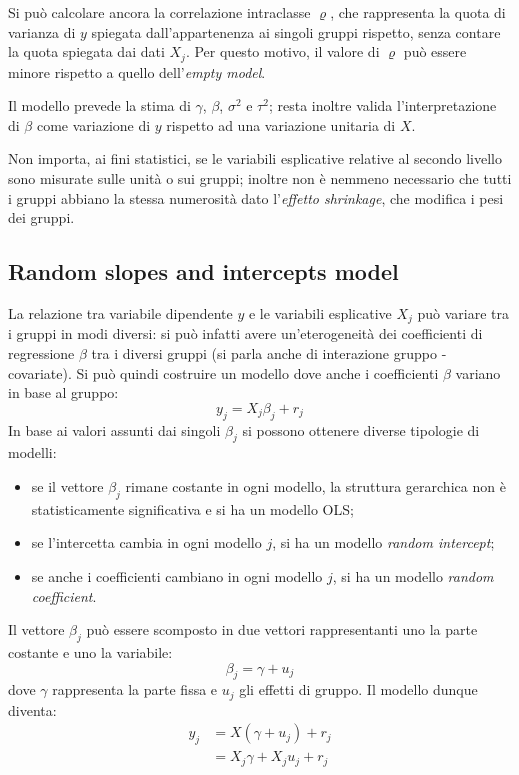 \documentclass[a4page, 11pt]{article} %
\begin{document}
Si può calcolare ancora la correlazione intraclasse $\varrho$, che rappresenta la quota di varianza di $y$ spiegata dall'appartenenza ai singoli gruppi rispetto, senza contare la quota spiegata dai dati $X_j$.
Per questo motivo, il valore di $\varrho$ può essere minore rispetto a quello dell'\textit{empty model}.

Il modello prevede la stima di $\gamma$, $\beta$, $\sigma^2$ e $\tau^2$; resta inoltre valida l'interpretazione di $\beta$ come variazione di $y$ rispetto ad una variazione unitaria di $X$.

Non importa, ai fini statistici, se le variabili esplicative relative al secondo livello sono misurate sulle unità o sui gruppi; inoltre non è nemmeno necessario che tutti i gruppi abbiano la stessa numerosità dato l'\textit{effetto shrinkage}, che modifica i pesi dei gruppi.

\subsection*{Random slopes and intercepts model} 
La relazione tra variabile dipendente $y$ e le variabili esplicative $X_j$ può variare tra i gruppi in modi diversi: si può infatti avere un’eterogeneità dei coefficienti di regressione $\beta$ tra i diversi gruppi (si parla anche di interazione gruppo - covariate).
Si può quindi costruire un modello dove anche i coefficienti $\beta$ variano in base al gruppo:
\begin{equation*}
y_j = X_j \beta_j + r_j
\end{equation*}
In base ai valori assunti dai singoli $\beta_j$ si possono ottenere diverse tipologie di modelli:
\begin{itemize}[noitemsep]
  \item se il vettore $\beta_j$ rimane costante in ogni modello, la struttura gerarchica non è statisticamente significativa e si ha un modello OLS;
\item se l'intercetta cambia in ogni modello $j$, si ha un modello \textit{random intercept};
\item se anche i coefficienti cambiano in ogni modello $j$, si ha un modello \textit{random coefficient}.
\end{itemize}
Il vettore $\beta_j$ può essere scomposto in due vettori rappresentanti uno la parte costante e uno la variabile:
\begin{equation*}
  \beta_j = \gamma + u_j
\end{equation*}
dove  $\gamma$ rappresenta la parte fissa e $u_j$ gli effetti di gruppo.
Il modello dunque diventa:
\begin{align*}
  y_j &= X (\gamma + u_j) + r_j \\
      &= X_j \gamma + X_j u_j + r_j
\end{align*}
\end{document}
